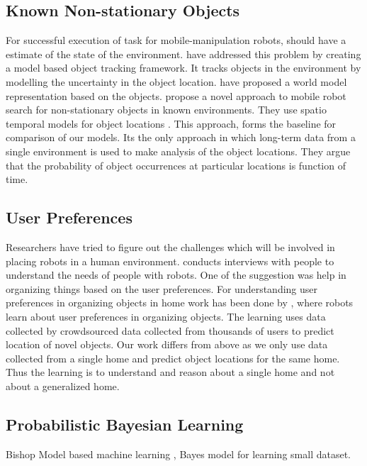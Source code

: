 \subsection{Known Non-stationary Objects}
\label{sub:known non-stationary objects}
For successful execution of task for mobile-manipulation robots, should have a estimate of the state of the environment. \cite{elfring_semantic_2013} have addressed this problem by creating a model based object tracking framework. It tracks objects in the environment by modelling the uncertainty in the object location.
\cite{wong_manipulation-based_2013} have proposed a world model representation based on the objects. 
\cite{krajnik_wheres_2015}  propose a novel  approach  to  mobile  robot
search  for  non-stationary  objects  in known  environments. They use spatio temporal models for object locations .
This approach, forms the baseline for comparison of our models. Its the only approach in which long-term data from a single environment is used to make analysis of the object locations. They argue that the  probability of object occurrences at particular locations is function of time.



\subsection{User Preferences}
\label{sub:user preference}
Researchers have tried to figure out the challenges which will be involved in
placing robots in a human environment.\cite{pantofaru_exploring_2012} conducts
interviews with people to understand the needs of people with robots. One of the
suggestion was help in organizing things based on the user preferences.
For understanding user preferences in organizing objects in home work has 
been done by  \cite{abdo_collaborative_2014}, where robots learn about user
preferences in organizing objects. The learning uses data collected by 
crowdsourced data collected from thousands of users to predict location of 
novel objects. Our work differs from above as we only use data collected from a single home and predict object locations for the same home. Thus the learning is to understand and reason about a single home and not about a generalized home.


\subsection{Probabilistic Bayesian Learning}

Bishop Model based machine learning , Bayes model for learning small dataset.